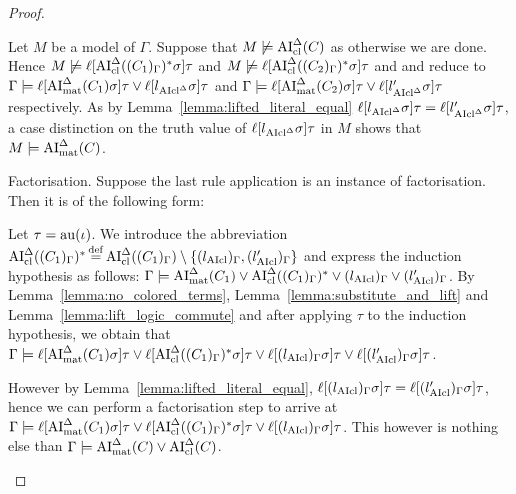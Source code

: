\documentclass[,%
	draft=false,%
	numbers=noendperiod
	11pt,
	a4paper,
	oneside,%
	openany,
]{memoir}
\begin{document}
\begin{proof}
\begin{description}
\begin{enumerate}
					Let $M$ be a model of $\Gamma$. Suppose that $M \not\models \operatorname{AI}_\mathrm{cl}^\Delta(C)$ as otherwise we are done. Hence $M \not\models \ell[\operatorname{AI}_\mathrm{cl}^\Delta((C_1)_\Gamma)^*\sigma]\tau$ and $M \not\models \ell[\operatorname{AI}_\mathrm{cl}^\Delta((C_2)_\Gamma)^*\sigma]\tau$ and \markA{} and \markB{} reduce to 
					$\Gamma \models \ell[\operatorname{AI}_\mathrm{mat}^\Delta(C_1)\sigma]\tau \lor \ell[l{_{\operatorname{AIcl}^\Delta}}\sigma]\tau$ 
					and 
					$\Gamma \models \ell[\operatorname{AI}_\mathrm{mat}^\Delta(C_2)\sigma]\tau \lor \ell[l{_{\operatorname{AIcl}^\Delta}'}\sigma]\tau$ respectively.
					As by Lemma~\ref{lemma:lifted_literal_equal} $\ell[l{_{\operatorname{AIcl}^\Delta}}\sigma]\tau = \ell[l{_{\operatorname{AIcl}^\Delta}'}\sigma]\tau$, a case distinction on the truth value of $\ell[l{_{\operatorname{AIcl}^\Delta}}\sigma]\tau$ in $M$ shows that $M\models \operatorname{AI}_\mathrm{mat}^\Delta(C)$.


			\end{enumerate}



		\item{Factorisation.}
			Suppose the last rule application is an instance of factorisation. Then it is of the following form:
			\begin{prooftree}
			\end{prooftree}

			Let $\tau = \operatorname{au}(\iota)$.
			We introduce the abbreviation $\operatorname{AI}_\mathrm{cl}^\Delta( (C_1)_\Gamma)^* \operatorname{\stackrel{\mathrm{def}}{=}} \operatorname{AI}_\mathrm{cl}^\Delta( (C_1)_\Gamma) \setminus \{ (l_{\operatorname{AIcl}})_\Gamma , (l'_{\operatorname{AIcl}})_\Gamma \}$ and express the induction hypothesis as follows:
			$\Gamma \models \operatorname{AI}_\mathrm{mat}^\Delta(C_1) \lor \operatorname{AI}_\mathrm{cl}^\Delta( (C_1)_\Gamma)^* \lor (l_{\operatorname{AIcl}})_\Gamma \lor (l'_{\operatorname{AIcl}})_\Gamma $.
			By Lemma~\ref{lemma:no_colored_terms}, Lemma~\ref{lemma:substitute_and_lift} and Lemma~\ref{lemma:lift_logic_commute} and after applying $\tau$ to the induction hypothesis, we obtain that 
			$\Gamma \models \ell[\operatorname{AI}_\mathrm{mat}^\Delta(C_1)\sigma]\tau \lor \ell[\operatorname{AI}_\mathrm{cl}^\Delta( (C_1)_\Gamma)^*\sigma]\tau \lor \ell[(l_{\operatorname{AIcl}})_\Gamma \sigma]\tau \lor \ell[(l'_{\operatorname{AIcl}})_\Gamma\sigma]\tau $.

			However by Lemma~\ref{lemma:lifted_literal_equal},
			$\ell[(l_{\operatorname{AIcl}})_\Gamma\sigma]\tau = 
			\ell[(l'_{\operatorname{AIcl}})_\Gamma\sigma]\tau$, hence we can perform a factorisation step to arrive at 
			$\Gamma \models \ell[\operatorname{AI}_\mathrm{mat}^\Delta(C_1)\sigma]\tau \lor \ell[\operatorname{AI}_\mathrm{cl}^\Delta( (C_1)_\Gamma)^*\sigma]\tau \lor \ell[(l_{\operatorname{AIcl}})_\Gamma \sigma]\tau$.
			This however is nothing else than $\Gamma\models \operatorname{AI}_\mathrm{mat}^\Delta(C) \lor \operatorname{AI}_\mathrm{cl}^\Delta(C)$.
			\qedhere
	\end{description}
\end{proof}
\end{document}
